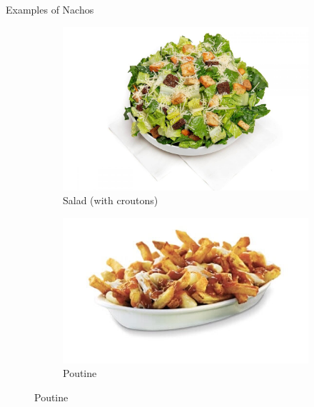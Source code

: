 \documentclass{beamer}
\begin{document}
\begin{frame}{Examples of Nachos}
    \begin{figure}
        \begin{subfigure}{.4\textwidth}
          \centering
          \includegraphics[width=\linewidth]{nachos/35_crouton_salad.jpg}
          \caption{\label{fig:crouton-salad}Salad (with croutons)}
        \end{subfigure}
        \begin{subfigure}{.5\textwidth}
          \centering
          \includegraphics[width=.8\linewidth]{nachos/35_poutine.jpg}
          \caption{\label{fig:poutine}Poutine}
        \end{subfigure}
    \end{figure}
\end{frame}
\end{document}
